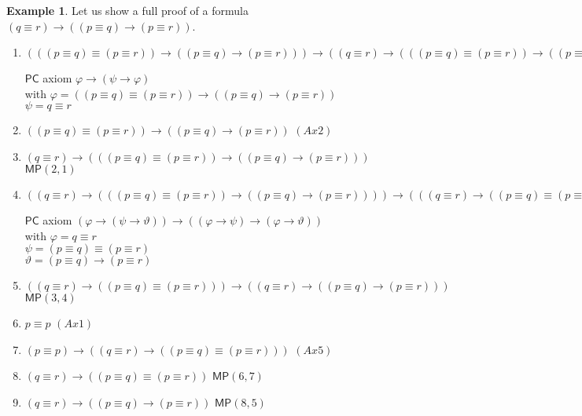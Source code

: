 \documentclass{article}
\theoremstyle{definition}
\theoremstyle{definition}
\newtheorem{example}{Example}[section]
\theoremstyle{definition}
\newcommand*{\id}{\equiv}
\newcommand*{\ra}{\rightarrow}
\newcommand{\PC}{$\mathsf{PC}$\xspace}
\newcommand{\MP}{\mathsf{MP}}
\begin{document}
\begin{example}
    \label{ex_pqr}
    Let us show a full proof of a formula $(q \id r) \ra ((p \id q) \ra (p \id r))$.

    \begin{enumerate}
        \item $(((p \id q) \id (p \id r)) \ra ((p \id q) \ra (p \id r))) \ra ((q \id r) \ra (((p \id q) \id (p \id r)) \ra ((p \id q) \ra (p \id r)))) $
              \begin{flushright} \PC axiom $\varphi \ra (\psi \ra \varphi)$ \\
                  with $\varphi = ((p \id q) \id (p \id r)) \ra ((p \id q) \ra (p \id r))$\\
                  $\psi = q \id r$
              \end{flushright}
        \item $((p \id q) \id (p \id r)) \ra ((p \id q) \ra (p \id r))  $ \hfill $(Ax2)$
        \item $(q \id r) \ra (((p \id q) \id (p \id r)) \ra ((p \id q) \ra (p \id r)))$ \hfill $\MP(2, 1)$
        \item $((q \id r) \ra (((p \id q) \id (p \id r)) \ra ((p \id q) \ra (p \id r)))) \ra (((q \id r) \ra ((p \id q) \id (p \id r))) \ra ((q \id r) \ra ((p \id q) \ra (p \id r)))) $ \begin{flushright}
                  \PC axiom $(\varphi \ra (\psi \ra \vartheta)) \ra ((\varphi \ra \psi) \ra (\varphi \ra \vartheta))$ \\
                  with $\varphi = q \id r$ \\
                  $\psi = (p \id q) \id (p \id r)$ \\
                  $\vartheta = (p \id q) \ra (p \id r)$
              \end{flushright}
        \item $((q \id r) \ra ((p \id q) \id (p \id r))) \ra ((q \id r) \ra ((p \id q) \ra (p \id r))) $ \hfill $\MP(3, 4)$
        \item $p \id p $ \hfill $(Ax1)$
        \item $(p \id p) \ra ((q \id r) \ra ((p \id q) \id (p \id r)))$ \hfill $(Ax5)$
        \item $(q \id r) \ra ((p \id q) \id (p \id r))$ \hfill $\MP(6, 7)$
        \item $(q \id r) \ra ((p \id q) \ra (p \id r))$ \hfill $\MP(8, 5)$
    \end{enumerate}
\end{example}
\end{document}
